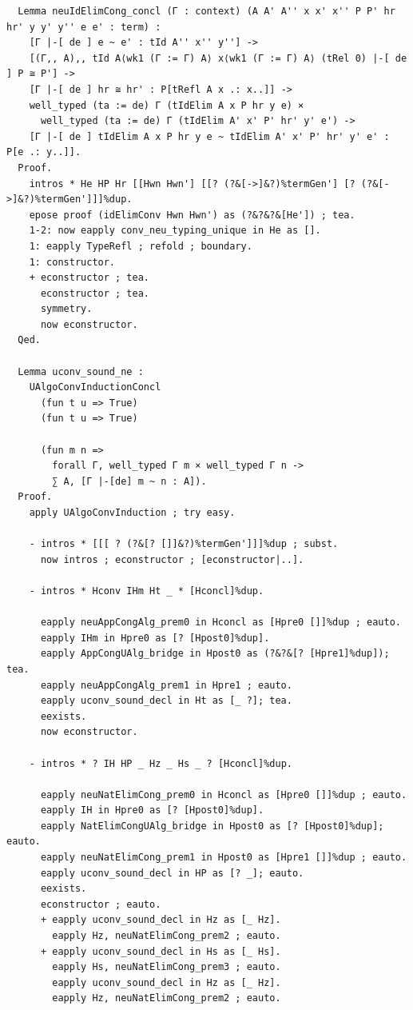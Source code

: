 \documentclass[10pt,a4paper]{amsart}
\begin{document}
\begin{lstlisting}
  Lemma neuIdElimCong_concl (Γ : context) (A A' A'' x x' x'' P P' hr hr' y y' y'' e e' : term) :
    [Γ |-[ de ] e ~ e' : tId A'' x'' y''] ->
    [(Γ,, A),, tId A⟨wk1 (Γ := Γ) A⟩ x⟨wk1 (Γ := Γ) A⟩ (tRel 0) |-[ de ] P ≅ P'] ->
    [Γ |-[ de ] hr ≅ hr' : P[tRefl A x .: x..]] ->
    well_typed (ta := de) Γ (tIdElim A x P hr y e) ×
      well_typed (ta := de) Γ (tIdElim A' x' P' hr' y' e') ->
    [Γ |-[ de ] tIdElim A x P hr y e ~ tIdElim A' x' P' hr' y' e' : P[e .: y..]].
  Proof.
    intros * He HP Hr [[Hwn Hwn'] [[? (?&[->]&?)%termGen'] [? (?&[->]&?)%termGen']]]%dup.
    epose proof (idElimConv Hwn Hwn') as (?&?&?&[He']) ; tea.
    1-2: now eapply conv_neu_typing_unique in He as [].
    1: eapply TypeRefl ; refold ; boundary.
    1: constructor.
    + econstructor ; tea.
      econstructor ; tea.
      symmetry.
      now econstructor.
  Qed.

  Lemma uconv_sound_ne :
    UAlgoConvInductionConcl
      (fun t u => True)
      (fun t u => True)

      (fun m n =>
        forall Γ, well_typed Γ m × well_typed Γ n ->
        ∑ A, [Γ |-[de] m ~ n : A]).
  Proof.
    apply UAlgoConvInduction ; try easy.
    
    - intros * [[[ ? (?&[? []]&?)%termGen']]]%dup ; subst.
      now intros ; econstructor ; [econstructor|..].

    - intros * Hconv IHm Ht _ * [Hconcl]%dup.

      eapply neuAppCongAlg_prem0 in Hconcl as [Hpre0 []]%dup ; eauto.
      eapply IHm in Hpre0 as [? [Hpost0]%dup].
      eapply AppCongUAlg_bridge in Hpost0 as (?&?&[? [Hpre1]%dup]); tea.
      eapply neuAppCongAlg_prem1 in Hpre1 ; eauto.
      eapply uconv_sound_decl in Ht as [_ ?]; tea.
      eexists.
      now econstructor.

    - intros * ? IH HP _ Hz _ Hs _ ? [Hconcl]%dup.

      eapply neuNatElimCong_prem0 in Hconcl as [Hpre0 []]%dup ; eauto.
      eapply IH in Hpre0 as [? [Hpost0]%dup].
      eapply NatElimCongUAlg_bridge in Hpost0 as [? [Hpost0]%dup]; eauto.
      eapply neuNatElimCong_prem1 in Hpost0 as [Hpre1 []]%dup ; eauto.
      eapply uconv_sound_decl in HP as [? _]; eauto.
      eexists.
      econstructor ; eauto.
      + eapply uconv_sound_decl in Hz as [_ Hz].
        eapply Hz, neuNatElimCong_prem2 ; eauto.
      + eapply uconv_sound_decl in Hs as [_ Hs].
        eapply Hs, neuNatElimCong_prem3 ; eauto.
        eapply uconv_sound_decl in Hz as [_ Hz].
        eapply Hz, neuNatElimCong_prem2 ; eauto.


\end{lstlisting}
\end{document}
